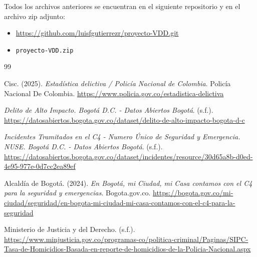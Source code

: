 \documentclass[12pt,letterpaper]{article}
\begin{document}
Todos los archivos anteriores se encuentran en el siguiente repositorio y en el archivo zip adjunto:

\begin{itemize}[noitemsep, topsep=0pt]
  \item \url{https://github.com/luisfgutierrezr/proyecto-VDD.git}
  \item \texttt{proyecto-VDD.zip}
\end{itemize}

\begin{thebibliography}{99}
\raggedright

Cisc. (2025). \textit{Estadística delictiva / Policía Nacional de Colombia}. Policía Nacional De Colombia. \url{https://www.policia.gov.co/estadistica-delictiva}

\textit{Delito de Alto Impacto. Bogotá D.C. - Datos Abiertos Bogotá}. (s.f.). \url{https://datosabiertos.bogota.gov.co/dataset/delito-de-alto-impacto-bogota-d-c}

\textit{Incidentes Tramitados en el C4 - Numero Único de Seguridad y Emergencia. NUSE. Bogotá D.C. - Datos Abiertos Bogotá}. (s.f.). \url{https://datosabiertos.bogota.gov.co/dataset/incidentes/resource/30d65a8b-d0ed-4e95-977e-0d7cc2ea89ef}

Alcaldía de Bogotá. (2024). \textit{En Bogotá, mi Ciudad, mi Casa contamos con el C4 para la seguridad y emergencias}. Bogota.gov.co. \url{https://bogota.gov.co/mi-ciudad/seguridad/en-bogota-mi-ciudad-mi-casa-contamos-con-el-c4-para-la-seguridad}

Ministerio de Justicia y del Derecho. (s.f.). \url{https://www.minjusticia.gov.co/programas-co/politica-criminal/Paginas/SIPC-Tasa-de-Homicidios-Basada-en-reporte-de-homicidios-de-la-Policia-Nacional.aspx}

\end{thebibliography}
\end{document}
